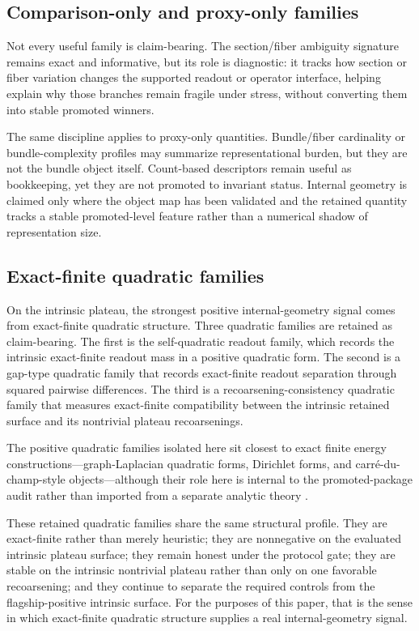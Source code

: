 \documentclass[11pt]{article}
\theoremstyle{definition}
\begin{document}
\subsection{Comparison-only and proxy-only families}

Not every useful family is claim-bearing. The section/fiber ambiguity signature remains exact and informative, but its role is diagnostic: it tracks how section or fiber variation changes the supported readout or operator interface, helping explain why those branches remain fragile under stress, without converting them into stable promoted winners.

The same discipline applies to proxy-only quantities. Bundle/fiber cardinality or bundle-complexity profiles may summarize representational burden, but they are not the bundle object itself. Count-based descriptors remain useful as bookkeeping, yet they are not promoted to invariant status. Internal geometry is claimed only where the object map has been validated and the retained quantity tracks a stable promoted-level feature rather than a numerical shadow of representation size.

\subsection{Exact-finite quadratic families}

On the intrinsic plateau, the strongest positive internal-geometry signal comes from exact-finite quadratic structure. Three quadratic families are retained as claim-bearing. The first is the self-quadratic readout family, which records the intrinsic exact-finite readout mass in a positive quadratic form. The second is a gap-type quadratic family that records exact-finite readout separation through squared pairwise differences. The third is a recoarsening-consistency quadratic family that measures exact-finite compatibility between the intrinsic retained surface and its nontrivial plateau recoarsenings.

The positive quadratic families isolated here sit closest to exact finite energy constructions---graph-Laplacian quadratic forms, Dirichlet forms, and carr\'{e}-du-champ-style objects---although their role here is internal to the promoted-package audit rather than imported from a separate analytic theory \cite{Chung1997,FukushimaOshimaTakeda1994,BakryEmery1985}.

These retained quadratic families share the same structural profile. They are exact-finite rather than merely heuristic; they are nonnegative on the evaluated intrinsic plateau surface; they remain honest under the protocol gate; they are stable on the intrinsic nontrivial plateau rather than only on one favorable recoarsening; and they continue to separate the required controls from the flagship-positive intrinsic surface. For the purposes of this paper, that is the sense in which exact-finite quadratic structure supplies a real internal-geometry signal.
\end{document}
